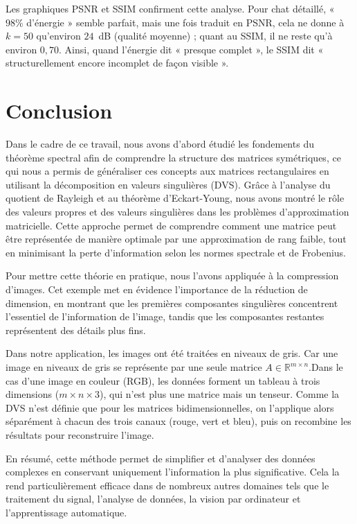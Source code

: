 \documentclass[12pt]{report}
\begin{document}
\vspace{0.3cm}
\noindent Les graphiques PSNR et SSIM confirment cette analyse. Pour chat détaillé, « $98\%$ d'énergie » semble parfait, mais une fois traduit en PSNR, cela ne donne à $k=50$ qu'environ $24$~dB (qualité moyenne) ; quant au SSIM, il ne reste qu'à environ $0{,}70$. Ainsi, quand l'énergie dit « presque complet », le SSIM dit « structurellement encore incomplet de façon visible ».

\vspace{0.4cm}


\section*{Conclusion}

\noindent Dans le cadre de ce travail, nous avons d'abord étudié les fondements du théorème spectral afin de comprendre la structure des matrices symétriques, ce qui nous a permis de généraliser ces concepts aux matrices rectangulaires en utilisant la décomposition en valeurs singulières (DVS). Grâce à l'analyse du quotient de Rayleigh et au théorème d'Eckart-Young, nous avons montré le rôle des valeurs propres et des valeurs singulières dans les problèmes d'approximation matricielle. Cette approche permet de comprendre comment une matrice peut être représentée de manière optimale par une approximation de rang faible, tout en minimisant la perte d'information selon les normes spectrale et de Frobenius.

Pour mettre cette théorie en pratique, nous l'avons appliquée à la compression d'images. Cet exemple met en évidence l'importance de la réduction de dimension, en montrant que les premières composantes singulières concentrent l'essentiel de l'information de l'image, tandis que les composantes restantes représentent des détails plus fins.

Dans notre application, les images ont été traitées en niveaux de gris. Car une image en niveaux de gris se représente par une seule matrice $A \in \mathbb{R}^{m \times n}$.Dans le cas d'une image en couleur (RGB), les données forment un tableau à trois dimensions ($m \times n \times 3$), qui n'est plus une matrice mais un tenseur. Comme la DVS n'est définie que pour les matrices bidimensionnelles, on l'applique alors séparément à chacun des trois canaux (rouge, vert et bleu), puis on recombine les résultats pour reconstruire l'image.

En résumé, cette méthode permet de simplifier et d'analyser des données complexes en conservant uniquement l'information la plus significative. Cela la rend particulièrement efficace dans de nombreux autres domaines tels que le traitement du signal, l'analyse de données, la vision par ordinateur et l'apprentissage automatique.
\end{document}

